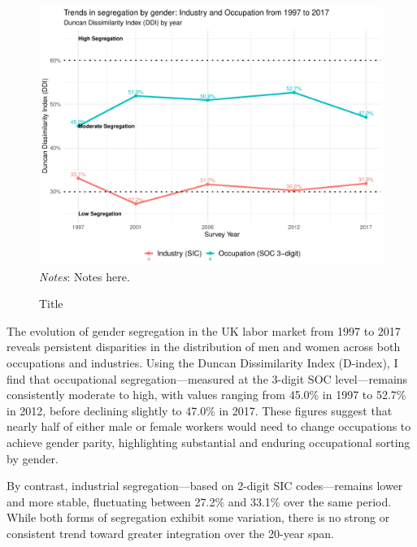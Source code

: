 \begin{figure}[!t]
    \centering
    \caption{Title}
    \includegraphics[width=\textwidth]{_graphic/industry_occupation3d_segreggation_fulltime.pdf}
    \label{fig:industry_occupation3d_segreggation_fulltime}
    \vspace{-3em}
    \justify\singlespacing\scriptsize\textit{Notes}: Notes here.
\end{figure}


The evolution of gender segregation in the UK labor market from 1997 to 2017 reveals persistent disparities
 in the distribution of men and women across both occupations and industries. Using the Duncan Dissimilarity 
 Index (D-index), I find that occupational segregation—measured at the 3-digit SOC level—remains consistently 
 moderate to high, with values ranging from 45.0\% in 1997 to 52.7\% in 2012, before declining slightly to 47.0\% 
 in 2017. These figures suggest that nearly half of either male or female workers would need to change occupations 
 to achieve gender parity, highlighting substantial and enduring occupational sorting by gender.

By contrast, industrial segregation—based on 2-digit SIC codes—remains lower and more stable, fluctuating 
between 27.2\% and 33.1\% over the same period. While both forms of segregation exhibit some variation, 
there is no strong or consistent trend toward greater integration over the 20-year span.

